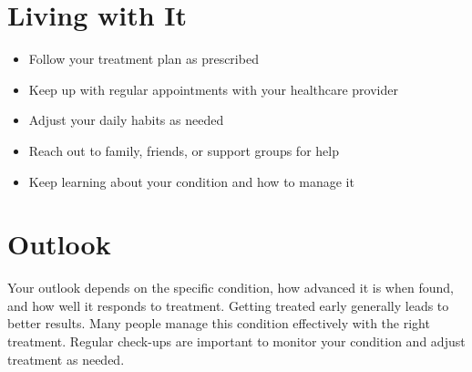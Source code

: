 \section{Living with It}

\begin{itemize}[noitemsep]
  \item Follow your treatment plan as prescribed
  \item Keep up with regular appointments with your healthcare provider
  \item Adjust your daily habits as needed
  \item Reach out to family, friends, or support groups for help
  \item Keep learning about your condition and how to manage it
\end{itemize}

\section{Outlook}
Your outlook depends on the specific condition, how advanced it is when found, and how well it responds to treatment. Getting treated early generally leads to better results. Many people manage this condition effectively with the right treatment. Regular check-ups are important to monitor your condition and adjust treatment as needed.
